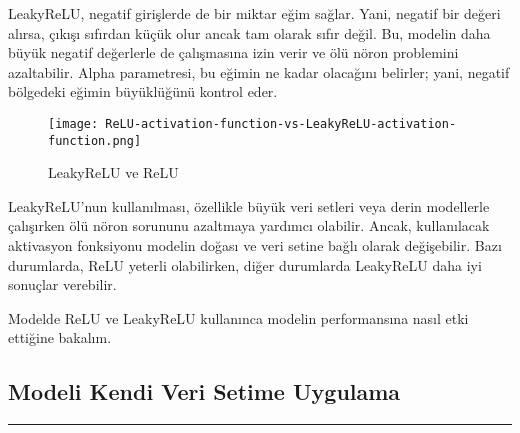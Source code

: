 \documentclass{article}
\begin{document}
\noindent LeakyReLU\cite{Baeldung}, negatif girişlerde de bir miktar eğim sağlar. Yani, negatif bir değeri alırsa, çıkışı sıfırdan küçük olur ancak tam olarak sıfır değil. Bu, modelin daha büyük negatif değerlerle de çalışmasına izin verir ve ölü nöron problemini azaltabilir. Alpha parametresi, bu eğimin ne kadar olacağını belirler; yani, negatif bölgedeki eğimin büyüklüğünü kontrol eder. \vspace{0.5cm}

\renewcommand{\figurename}{Şekil}

\begin{figure}[htbp]
     \centering
\texttt{[image: ReLU-activation-function-vs-LeakyReLU-activation-function.png]}\centering 
  \caption{LeakyReLU ve ReLU \cite{Relu}}
  \label{fig:resim_etiketi}
\end{figure}

\clearpage
\noindent LeakyReLU'nun kullanılması, özellikle büyük veri setleri veya derin modellerle çalışırken ölü nöron sorununu azaltmaya yardımcı olabilir. Ancak, kullanılacak aktivasyon fonksiyonu modelin doğası ve veri setine bağlı olarak değişebilir. Bazı durumlarda, ReLU yeterli olabilirken, diğer durumlarda LeakyReLU daha iyi sonuçlar verebilir. 

\noindent Modelde ReLU ve LeakyReLU kullanınca modelin performansına nasıl etki ettiğine bakalım. \vspace{0.5cm}

\renewcommand{\tablename}{Tablo}

\begin{table}[h!]
    \centering
    \label{tab:ModelDoğrulukları}
    \caption{ReLU ve LeakyReLU Katmanlarının Etkisi}
\end{table}

\subsection{Modeli Kendi Veri Setime Uygulama}
\rule{\textwidth}{0.5pt}\\[10pt]
\end{document}
